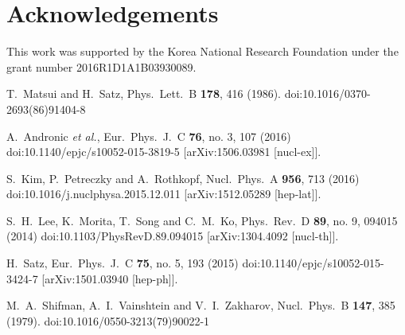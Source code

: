 \documentclass[aps,prc,superscriptaddress,showpacs,floatfix, nofootinbib,preprintnumbers,twocolumn]{revtex4}
\begin{document}
\section*{Acknowledgements}

This work was supported by the Korea National Research
Foundation under the grant number 2016R1D1A1B03930089.

\begin{thebibliography}{50}

  T.~Matsui and H.~Satz,
  Phys.\ Lett.\ B {\bf 178}, 416 (1986).
  doi:10.1016/0370-2693(86)91404-8
  
  A.~Andronic {\it et al.},
  Eur.\ Phys.\ J.\ C {\bf 76}, no. 3, 107 (2016)
  doi:10.1140/epjc/s10052-015-3819-5
  [arXiv:1506.03981 [nucl-ex]].

  S.~Kim, P.~Petreczky and A.~Rothkopf,
  Nucl.\ Phys.\ A {\bf 956}, 713 (2016)
  doi:10.1016/j.nuclphysa.2015.12.011
  [arXiv:1512.05289 [hep-lat]].

  S.~H.~Lee, K.~Morita, T.~Song and C.~M.~Ko,
  Phys.\ Rev.\ D {\bf 89}, no. 9, 094015 (2014)
  doi:10.1103/PhysRevD.89.094015
  [arXiv:1304.4092 [nucl-th]].
  
  H.~Satz,
  Eur.\ Phys.\ J.\ C {\bf 75}, no. 5, 193 (2015)
  doi:10.1140/epjc/s10052-015-3424-7
  [arXiv:1501.03940 [hep-ph]].

  M.~A.~Shifman, A.~I.~Vainshtein and V.~I.~Zakharov,
  Nucl.\ Phys.\ B {\bf 147}, 385 (1979).
  doi:10.1016/0550-3213(79)90022-1
  

\end{thebibliography}
\end{document}
